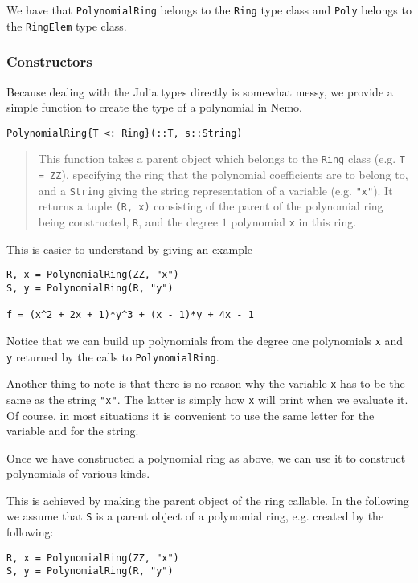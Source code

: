\documentclass[a4paper,10pt]{article}
\newcommand{\code}{\lstinline}
\newcommand{\desc}[1]{\vspace{-3mm}\begin{quote}#1\end{quote}}
\begin{document}
{{We have that \code{PolynomialRing} belongs to the \code{Ring} type class and \code{Poly}
belongs to the \code{RingElem} type class.

\subsubsection{Constructors}

Because dealing with the Julia types directly is somewhat messy, we provide a simple
function to create the type of a polynomial in Nemo.

\begin{lstlisting}
PolynomialRing{T <: Ring}(::T, s::String)
\end{lstlisting}

\desc{This function takes a parent object which belongs to the \code|Ring| class 
(e.g. \code|T = ZZ|), specifying the ring that the polynomial coefficients are to 
belong to, and a \code{String} giving the string representation of a variable (e.g. 
\code|"x"|). It returns a tuple \code|(R, x)| consisting of the parent of the polynomial
ring being constructed, \code|R|, and the degree $1$ polynomial \code|x| in this ring.}

This is easier to understand by giving an example

\begin{lstlisting}
R, x = PolynomialRing(ZZ, "x")
S, y = PolynomialRing(R, "y")

f = (x^2 + 2x + 1)*y^3 + (x - 1)*y + 4x - 1
\end{lstlisting}

Notice that we can build up polynomials from the degree one polynomials \code{x} and
\code{y} returned by the calls to \code{PolynomialRing}. 

Another thing to note is that there is no reason why the variable \code{x} has to 
be the same as the string \code{"x"}. The latter is simply how \code{x} will print
when we evaluate it. Of course, in most situations it is convenient to use the same 
letter for the variable and for the string.

Once we have constructed a polynomial ring as above, we can use it to construct
polynomials of various kinds.

This is achieved by making the parent object of the ring callable. In the following
we assume that \code{S} is a parent object of a polynomial ring, e.g. created by
the following:

\begin{lstlisting}
R, x = PolynomialRing(ZZ, "x")
S, y = PolynomialRing(R, "y")
\end{lstlisting}

}}
\end{document}
